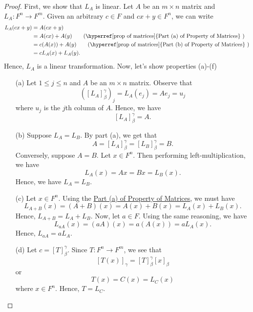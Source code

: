 \begin{proof}
First, we show that \( {L}_{A} \) is linear. Let \( A  \) be an \( m \times n  \) matrix and \( L_{A} : F^{n} \to F^{m} \). Given an arbitrary \( c \in F  \) and \( cx + y \in  F^{n}  \), we can write
   \begin{align*}
       {L}_{A}(cx+y) &= A(cx+y)    \\
                     &= A(cx) + A(y) \tag{{\hyperref[prop of matrices]{Part (a) of Property of Matrices}} } \\
                     &= c(A(x)) + A(y) \tag{{\hyperref[prop of matrices]{Part (b) of Property of Matrices}} } \\
                     &=  c {L}_{A}(x) + {L}_{A}(y). 
   \end{align*} 
   Hence, \( {L}_{A} \) is a linear transformation. Now, let's show properties (a)-(f) 
   \begin{enumerate}
       \item[(a)] Let \( 1 \leq j \leq n  \) and \( A  \) be an \( m \times n  \) matrix. Observe that 
           \[  ([{L}_{A}]_{\beta}^{\gamma} )_{j} = {L}_{A}({e}_{j}) = A {e}_{j} = {u}_{j}  \]
           where \( {u}_{j}  \) is the \( j \)th column of \( A  \). Hence, we have 
           \[ [{L}_{A}]_{\beta}^{\gamma} = A.    \]
        \item[(b)] Suppose \( {L}_{A} = {L}_{B} \). By part (a), we get that
            \[  A = [{L}_{A}]_{\beta}^{\gamma} = [{L}_{B}]_{\beta}^{\gamma}  = B. \]
            Conversely, suppose \( A = B  \). Let \( x \in F^{n} \). Then performing left-multiplication, we have
            \[  {L}_{A}(x) =  Ax = Bx = {L}_{B}(x).  \]
            Hence, we have \( {L}_{A} = {L}_{B} \).
        \item[(c)] Let \( x \in F^{n} \). Using the {\hyperref[prop of matrices]{Part (a) of Property of Matrices}}, we must have
            \[  {L}_{A+B}(x) = (A+B)(x) = A(x) + B(x) = {L}_{A}(x) + {L}_{B}(x). \]
            Hence, \( {L}_{A+B} = {L}_{A} + {L}_{B} \). Now, let \( a \in F  \). Using the same reasoning, we have  
            \[  {L}_{aA}(x) = (aA)(x) = a (A(x)) = a {L}_{A}(x).  \]
            Hence, \( {L}_{aA} = a{L}_{A}. \)
        \item[(d)] Let \( c = [T]_{\beta}^{\gamma}  \). Since \( T: F^{n} \to F^{m} \), we see that 
            \[  [T(x)]_{\gamma} = [T]_{\beta}^{\gamma} [x]_{\beta}      \]
            or 
            \[  T(x) = C(x) = {L}_{C}(x) \]
            where \( x \in F^{n} \). Hence, \( T = {L}_{C} \).
   \end{enumerate}
\end{proof}

